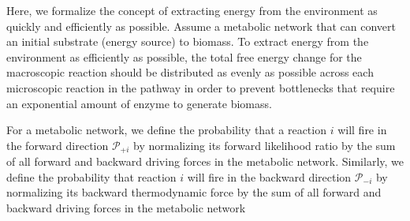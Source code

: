 Here, we formalize the concept of extracting energy from the environment as quickly and efficiently as possible. Assume a metabolic network that can convert an initial substrate (energy source) to biomass. To extract energy from the environment as efficiently as possible, the total free energy change for the macroscopic reaction should be distributed as evenly as possible across each microscopic reaction in the pathway in order to prevent bottlenecks that require an exponential amount of enzyme to generate biomass.


For a metabolic network, we define the probability that a reaction $i$ will fire in the forward  direction ${\mathcal P_{+i}}$ by normalizing its forward likelihood ratio by the sum of all forward and backward driving forces in the metabolic network. Similarly, we define the probability that reaction $i$ will fire in the backward direction $\mathcal P_{-i}$ by normalizing its backward thermodynamic force by  the sum of all forward and backward driving forces in the metabolic network